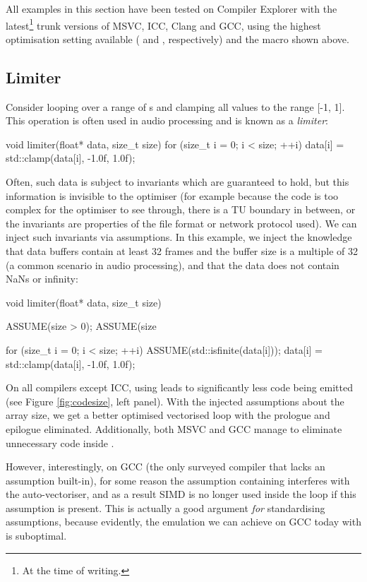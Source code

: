 All examples in this section have been tested on Compiler Explorer with the latest\footnote{At the time of writing.} trunk versions of MSVC, ICC, Clang and GCC, using the highest optimisation setting available ( and , respectively) and the  macro shown above.

\subsection{Limiter}

Consider looping over a range of s and clamping all values to the range [-1, 1]. This operation is often used in audio processing and is known as a \emph{limiter}:
\begin{codeblock}
void limiter(float* data, size_t size) {   
    for (size_t i = 0; i < size; ++i)
        data[i] = std::clamp(data[i], -1.0f, 1.0f);
}
\end{codeblock}
Often, such data is subject to invariants which are guaranteed to hold, but this information is invisible to the optimiser (for example because the code is too complex for the optimiser to see through, there is a TU boundary in between, or the invariants are properties of the file format or network protocol used). We can inject such invariants via assumptions. In this example, we inject the knowledge that data buffers contain at least 32 frames and the buffer size is a multiple of 32 (a common scenario in audio processing), and that the data does not contain NaNs or infinity:
\begin{codeblock}
void limiter(float* data, size_t size) {
    ASSUME(size > 0);
    ASSUME(size %
    
    for (size_t i = 0; i < size; ++i) {
        ASSUME(std::isfinite(data[i]));
        data[i] = std::clamp(data[i], -1.0f, 1.0f);
    }
}
\end{codeblock}

On all compilers except ICC, using  leads to significantly less code being emitted (see Figure \ref{fig:codesize}, left panel). With the injected assumptions about the array size, we get a better optimised vectorised loop with the prologue and epilogue eliminated. Additionally, both MSVC and GCC manage to eliminate unnecessary code inside .

However, interestingly, on GCC (the only surveyed compiler that lacks an assumption built-in), for some reason the assumption containing  interferes with the auto-vectoriser, and as a result SIMD is no longer used inside the loop if this assumption is present. This is actually a good argument \emph{for} standardising assumptions, because evidently, the emulation we can achieve on GCC today with  is suboptimal.

